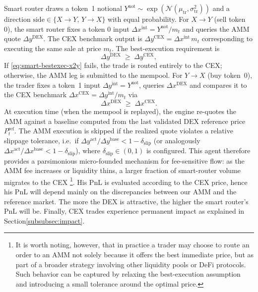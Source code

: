 \documentclass[11pt]{article}
\begin{document}
Smart router draws a token~1 notional
$
Y^{\mathrm{not}} \sim \exp(\mathcal{N}(\mu_{\mathrm{tr}},\sigma^2_{\mathrm{tr}}))
$
and a direction $\mathrm{side}\in\{X\!\to\!Y,\,Y\!\to\!X\}$ with equal probability.
For $X\!\to\!Y$ (sell token 0), the smart router fixes a token 0 input
$
\Delta x^{\mathrm{int}} = Y^{\mathrm{not}}/m_t
$
and queries the AMM quote $\Delta y^{\mathrm{DEX}}$.
The CEX benchmark output is $\Delta y^{\mathrm{CEX}} = \Delta x^{\mathrm{int}}\,m_t$
corresponding to executing the same sale at price $m_t$.
The best-execution requirement is
\begin{equation}
  \Delta y^{\mathrm{DEX}} \;\ge\; \Delta y^{\mathrm{CEX}},
  \label{eq:smart-bestexec-x2y}
\end{equation}
If \eqref{eq:smart-bestexec-x2y} fails, the trade
is routed entirely to the CEX; otherwise, the AMM leg is submitted to the mempool.
For $Y\!\to\!X$ (buy token~0), the trader fixes a token~1 input $\Delta y^{\mathrm{int}}=Y^{\mathrm{not}}$,
queries $\Delta x^{\mathrm{DEX}}$ and compares it to the CEX benchmark
\(
\Delta x^{\mathrm{CEX}} = \Delta y^{\mathrm{int}}/m_t
\)
via
\begin{equation}
  \Delta x^{\mathrm{DEX}} \;\ge\; \Delta x^{\mathrm{CEX}}.
  \label{eq:smart-bestexec-y2x}
\end{equation}
At execution time (when the mempool is replayed), the engine re-quotes the AMM against a baseline
computed from the last validated DEX reference price $P_t^{\mathrm{ref}}$.
The AMM execution is skipped if the realized quote violates a relative slippage tolerance, i.e.\ if
\(
\Delta y^{\mathrm{act}}/\Delta y^{\mathrm{base}} < 1-\delta_{\mathrm{slip}}
\)
(or analogously $\Delta x^{\mathrm{act}}/\Delta x^{\mathrm{base}} < 1-\delta_{\mathrm{slip}}$), where
$\delta_{\mathrm{slip}}\in(0,1)$ is configured.
This agent therefore provides a parsimonious micro-founded mechanism for fee-sensitive flow: as the AMM
fee increases or liquidity thins, a larger fraction of smart-router volume migrates to the CEX \footnote{It is worth noting, however, that in practice a trader may choose to route an order to an AMM not solely because it offers the best immediate price, but as part of a broader strategy involving other liquidity pools or DeFi protocols. Such behavior can be captured by relaxing the best-execution assumption and introducing a small tolerance around the optimal price.}. His PnL is evaluated according to the CEX price, hence his PnL will depend mainly on the discrepancies between our AMM and the reference market. The more the DEX is attractive, the higher the smart router's PnL will be. Finally, CEX trades experience permanent impact as explained in Section\ref{subsubsec:impact}.
\end{document}
